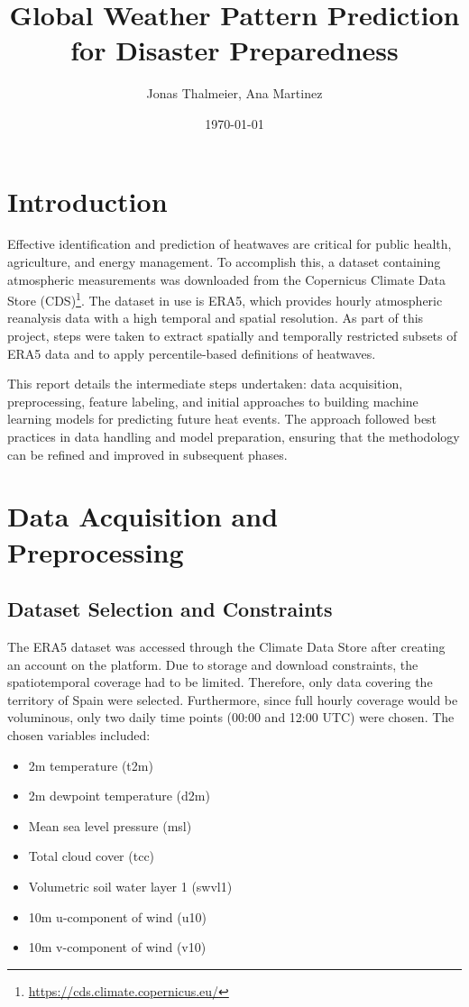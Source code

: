 \documentclass[8pt,a4paper]{article}
\title{Global Weather Pattern Prediction for Disaster Preparedness}
\author{Jonas Thalmeier, Ana Martinez}
\date{\today}
\begin{document}
\maketitle


\section{Introduction}
Effective identification and prediction of heatwaves are critical for public health, agriculture, and energy management. To accomplish this, a dataset containing atmospheric measurements was downloaded from the Copernicus Climate Data Store (CDS)\footnote{\url{https://cds.climate.copernicus.eu/}}. The dataset in use is ERA5, which provides hourly atmospheric reanalysis data with a high temporal and spatial resolution. As part of this project, steps were taken to extract spatially and temporally restricted subsets of ERA5 data and to apply percentile-based definitions of heatwaves.

This report details the intermediate steps undertaken: data acquisition, preprocessing, feature labeling, and initial approaches to building machine learning models for predicting future heat events. The approach followed best practices in data handling and model preparation, ensuring that the methodology can be refined and improved in subsequent phases.

\section{Data Acquisition and Preprocessing}

\subsection{Dataset Selection and Constraints}
The ERA5 dataset was accessed through the Climate Data Store after creating an account on the platform. Due to storage and download constraints, the spatiotemporal coverage had to be limited. Therefore, only data covering the territory of Spain were selected. Furthermore, since full hourly coverage would be voluminous, only two daily time points (00:00 and 12:00 UTC) were chosen. The chosen variables included:
\begin{itemize}
    \item 2m temperature (t2m)
    \item 2m dewpoint temperature (d2m)
    \item Mean sea level pressure (msl)
    \item Total cloud cover (tcc)
    \item Volumetric soil water layer 1 (swvl1)
    \item 10m u-component of wind (u10)
    \item 10m v-component of wind (v10)
\end{itemize}
\end{document}

